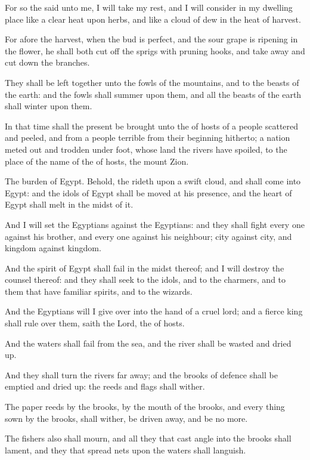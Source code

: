 \Verse For so the \LORD said unto me, I will take my rest, and I will consider in my dwelling place like a clear heat upon herbs, and like a cloud of dew in the heat of harvest.

\Verse For afore the harvest, when the bud is perfect, and the sour grape is ripening in the flower, he shall both cut off the sprigs with pruning hooks, and take away and cut down the branches.

\Verse They shall be left together unto the fowls of the mountains, and to the beasts of the earth: and the fowls shall summer upon them, and all the beasts of the earth shall winter upon them.

\Verse In that time shall the present be brought unto the \LORD of hosts of a people scattered and peeled, and from a people terrible from their beginning hitherto; a nation meted out and trodden under foot, whose land the rivers have spoiled, to the place of the name of the \LORD of hosts, the mount Zion.


\Chapter
\Verse The burden of Egypt. Behold, the \LORD rideth upon a swift cloud, and shall come into Egypt: and the idols of Egypt shall be moved at his presence, and the heart of Egypt shall melt in the midst of it.

\Verse And I will set the Egyptians against the Egyptians: and they shall fight every one against his brother, and every one against his neighbour; city against city, and kingdom against kingdom.

\Verse And the spirit of Egypt shall fail in the midst thereof; and I will destroy the counsel thereof: and they shall seek to the idols, and to the charmers, and to them that have familiar spirits, and to the wizards.

\Verse And the Egyptians will I give over into the hand of a cruel lord; and a fierce king shall rule over them, saith the Lord, the \LORD of hosts.

\Verse And the waters shall fail from the sea, and the river shall be wasted and dried up.

\Verse And they shall turn the rivers far away; and the brooks of defence shall be emptied and dried up: the reeds and flags shall wither.

\Verse The paper reeds by the brooks, by the mouth of the brooks, and every thing sown by the brooks, shall wither, be driven away, and be no more.

\Verse The fishers also shall mourn, and all they that cast angle into the brooks shall lament, and they that spread nets upon the waters shall languish.

